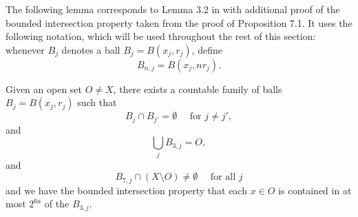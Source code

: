 The following lemma corresponds to Lemma 3.2 in \cite{stein-book} with additional proof of the bounded intersection property taken from the proof of Proposition 7.1.
It uses the following notation, which will be used throughout the rest of this section: whenever $B_j$ denotes a ball $B_j = B(x_j, r_j)$, define
\begin{equation*}
    B_{n,j} = B(x_j, nr_j).
\end{equation*}
\begin{lemma}
    \label{ball-covering}
    \leanok
    Given an open set $O\ne X$, there exists a countable family of balls $B_j = B(x_j, r_j)$ such that
    \begin{equation}
        \label{balls-disjoint}
        B_j \cap B_{j'} = \emptyset \quad \text{ for } j \ne j',
    \end{equation}
    and
    \begin{equation}
        \label{balls-covering}
        \bigcup_j B_{3,j} = O,
    \end{equation}
    and
    \begin{equation}
        \label{enlarged-balls-intersect-complement}
        B_{7,j} \cap (X \setminus O) \ne \emptyset \quad \text{ for all } j
    \end{equation}
    and we have the bounded intersection property that each $x\in O$ is contained in at most $2^{6a}$ of the $B_{3,j}$.
\end{lemma}
